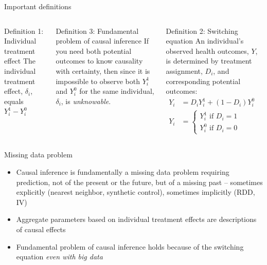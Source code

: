 \documentclass{beamer}
\begin{document}
\begin{frame}{Important definitions}


  \begin{columns}[t]
    \scriptsize

    \begin{block}{Definition 1: Individual treatment effect}
      The individual treatment effect,  $\delta_i$, equals $Y_i^1-Y_i^0$
    \end{block}
    \begin{block}{Definition 3: Fundamental problem of causal inference}
      If you need both potential outcomes to know causality with certainty, then since it is impossible to observe both $Y_i^1$ and $Y_i^0$ for the same individual, $\delta_i$, is \emph{unknowable}.
    \end{block}
    \begin{block}{Definition 2: Switching equation}
      An individual's observed health outcomes, $Y$, is determined by treatment assignment, $D_i$, and corresponding potential outcomes:
      \begin{eqnarray*}
        Y_i& = D_iY^1_i+(1-D_i)Y^0_i& \\
        Y_i& = \begin{cases}
          Y^1_i\text{ if }D_i=1 \\
          Y^0_i\text{ if }D_i=0
        \end{cases}
      \end{eqnarray*}
    \end{block}

  \end{columns}
\end{frame}

\begin{frame}{Missing data problem}

  \begin{itemize}
    \item Causal inference is fundamentally a missing data problem requiring prediction, not of the present or the future, but of a missing past -- sometimes explicitly (nearest neighbor, synthetic control), sometimes implicitly (RDD, IV)
    \item Aggregate parameters based on individual treatment effects are descriptions of causal effects
    \item Fundamental problem of causal inference holds because of the switching equation \emph{even with big data}
  \end{itemize}

\end{frame}
\end{document}
